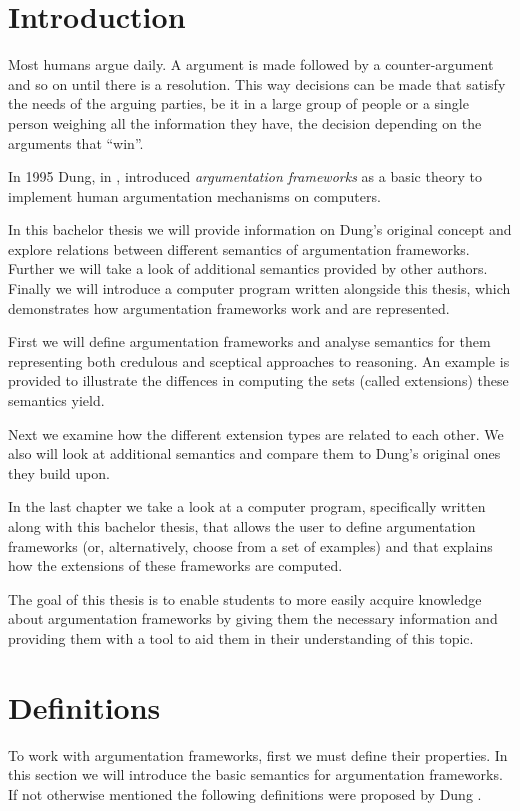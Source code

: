 \documentclass[draft,final]{vutinfth} %
\newcommand{\hl}{\par\vspace{6pt}} %
\newcommand{\cl}{\par\vspace{12pt}} %
\begin{document}
\chapter{Introduction}
Most humans argue daily. A argument is made followed by a counter-argument and so on until there is a resolution. This way decisions can be made that satisfy the needs of the arguing parties, be it in a large group of people or a single person weighing all the information they have, the decision depending on the arguments that ``win''.\hl
In 1995 Dung, in \cite{Dung}, introduced \emph{argumentation frameworks} as a basic theory to implement human argumentation mechanisms on computers.\hl
In this bachelor thesis we will provide information on Dung's original concept and explore relations between different semantics of argumentation frameworks. Further we will take a look of additional semantics provided by other authors. Finally we will introduce a computer program written alongside this thesis, which demonstrates how argumentation frameworks work and are represented.\cl %
First we will define argumentation frameworks and analyse semantics for them representing both credulous and sceptical approaches to reasoning. An example is provided to illustrate the diffences in computing the sets (called extensions) these semantics yield.\hl
Next we examine how the different extension types are related to each other. We also will look at additional semantics and compare them to Dung's original ones they build upon.\hl
In the last chapter we take a look at a computer program, specifically written along with this bachelor thesis, that allows the user to define argumentation frameworks (or, alternatively, choose from a set of examples) and that explains how the extensions of these frameworks are computed.\cl
The goal of this thesis is to enable students to more easily acquire knowledge about argumentation frameworks by giving them the necessary information and providing them with a tool to aid them in their understanding of this topic.%

\chapter{Definitions}

To work with argumentation frameworks, first we must define their properties. In this section we will introduce the basic semantics for argumentation frameworks. If not otherwise mentioned the following definitions were proposed by Dung \cite{Dung}.\cl
\end{document}
